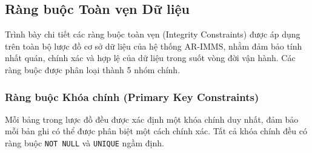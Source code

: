 \subsection{Ràng buộc Toàn vẹn Dữ liệu}

 Trình bày chi tiết các ràng buộc toàn vẹn (Integrity Constraints) được áp dụng trên toàn bộ lược đồ cơ sở dữ liệu của hệ thống AR-IMMS, nhằm đảm bảo tính nhất quán, chính xác và hợp lệ của dữ liệu trong suốt vòng đời vận hành. Các ràng buộc được phân loại thành 5 nhóm chính.

\subsubsection{Ràng buộc Khóa chính (Primary Key Constraints)}

Mỗi bảng trong lược đồ đều được xác định một khóa chính duy nhất, đảm bảo mỗi bản ghi có thể được phân biệt một cách chính xác. Tất cả khóa chính đều có ràng buộc \texttt{NOT NULL} và \texttt{UNIQUE} ngầm định.

